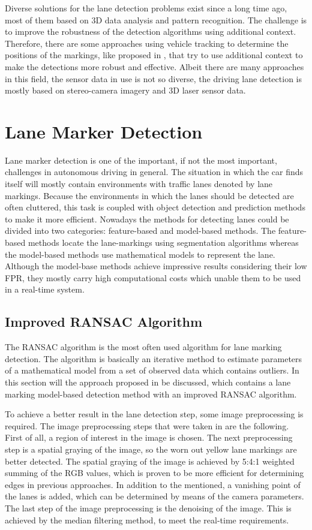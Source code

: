 \documentclass[conference]{IEEEtran}
\begin{document}
Diverse solutions for the lane detection problems exist since a long time ago, most of them based on 3D data analysis and pattern recognition. The challenge is to improve the robustness of the detection algorithms using additional context. Therefore, there are some approaches using vehicle tracking to determine the positions of the markings, like proposed in \cite{virtuallane}, that try to use additional context to make the detections more robust and effective. Albeit there are many approaches in this field, the sensor data in use is not so diverse, the driving lane detection is mostly based on stereo-camera imagery and 3D laser sensor data.


\section{Lane Marker Detection}

Lane marker detection is one of the important, if not the most important, challenges in autonomous driving in general. The situation in which the car finds itself will mostly contain environments with traffic lanes denoted by lane markings. Because the environments in which the lanes should be detected are often cluttered, this task is coupled with object detection and prediction methods to make it more efficient. Nowadays the methods for detecting lanes could be divided into two categories: feature-based and model-based methods. The feature-based methods locate the lane-markings using segmentation algorithms whereas the model-based methods use mathematical models to represent the lane. Although the model-base methods achieve impressive results considering their low FPR, they mostly carry high computational costs which unable them to be used in a real-time system.

\subsection{Improved RANSAC Algorithm}

The RANSAC algorithm is the most often used algorithm for lane marking detection. The algorithm is basically an iterative method to estimate parameters of a mathematical model from a set of observed data which contains outliers. In this section will the approach proposed in \cite{ransac} be discussed, which contains a lane marking model-based detection method with an improved RANSAC algorithm.

To achieve a better result in the lane detection step, some image preprocessing is required. The image preprocessing steps that were taken in \cite{ransac} are the following. First of all, a region of interest in the image is chosen. The next preprocessing step is a spatial graying of the image, so the worn out yellow lane markings are better detected. The spatial graying of the image is achieved by 5:4:1 weighted summing of the RGB values, which is proven to be more efficient for determining edges in previous approaches. In addition to the mentioned, a vanishing point of the lanes is added, which can be determined by means of the camera parameters. The last step of the image preprocessing is the denoising of the image. This is achieved by the median filtering method, to meet the real-time requirements.
\end{document}
